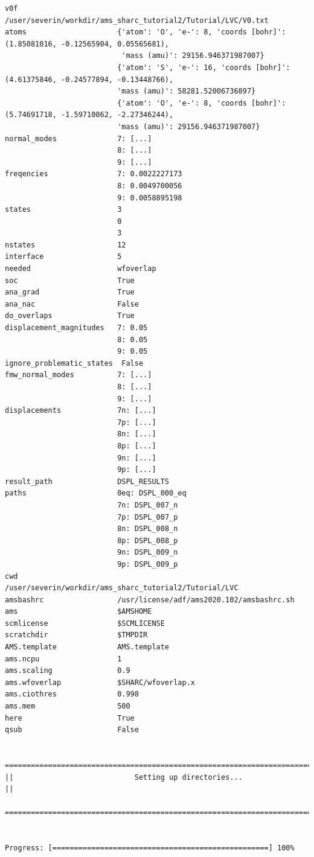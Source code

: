 \documentclass[a4paper,11pt,DIV=15,openany]{scrbook}
\begin{document}
\begin{oframed}
\begin{Verbatim}[commandchars=\\\{\}]
v0f                       /user/severin/workdir/ams_sharc_tutorial2/Tutorial/LVC/V0.txt
atoms                     {'atom': 'O', 'e-': 8, 'coords [bohr]': (1.85081016, -0.12565904, 0.05565681), 
                           'mass (amu)': 29156.946371987007}
                          {'atom': 'S', 'e-': 16, 'coords [bohr]': (4.61375846, -0.24577894, -0.13448766), 
                          'mass (amu)': 58281.52006736897}
                          {'atom': 'O', 'e-': 8, 'coords [bohr]': (5.74691718, -1.59710862, -2.27346244), 
                          'mass (amu)': 29156.946371987007}
normal_modes              7: [...]
                          8: [...]
                          9: [...]
freqencies                7: 0.0022227173
                          8: 0.0049700056
                          9: 0.0058895198
states                    3
                          0
                          3
nstates                   12
interface                 5
needed                    wfoverlap
soc                       True
ana_grad                  True
ana_nac                   False
do_overlaps               True
displacement_magnitudes   7: 0.05
                          8: 0.05
                          9: 0.05
ignore_problematic_states  False
fmw_normal_modes          7: [...]
                          8: [...]
                          9: [...]
displacements             7n: [...]
                          7p: [...]
                          8n: [...] 
                          8p: [...] 
                          9n: [...]
                          9p: [...]
result_path               DSPL_RESULTS
paths                     0eq: DSPL_000_eq
                          7n: DSPL_007_n
                          7p: DSPL_007_p
                          8n: DSPL_008_n
                          8p: DSPL_008_p
                          9n: DSPL_009_n
                          9p: DSPL_009_p
cwd                       /user/severin/workdir/ams_sharc_tutorial2/Tutorial/LVC
amsbashrc                 /usr/license/adf/ams2020.102/amsbashrc.sh
ams                       $AMSHOME
scmlicense                $SCMLICENSE
scratchdir                $TMPDIR
AMS.template              AMS.template
ams.ncpu                  1
ams.scaling               0.9
ams.wfoverlap             $SHARC/wfoverlap.x
ams.ciothres              0.998
ams.mem                   500
here                      True
qsub                      False

  ================================================================================
||                            Setting up directories...                           ||
  ================================================================================


Progress: [==================================================] 100%
\end{Verbatim}
\end{oframed}
\end{document}
